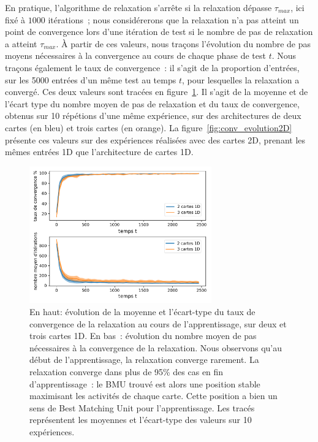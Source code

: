 \documentclass[../main]{subfiles}
\begin{document}
En pratique, l'algorithme de relaxation s'arrête si la relaxation dépasse $\tau_{max}$, ici fixé à $1000$ itérations~; nous considérerons que la relaxation n'a pas atteint un point de convergence lors d'une itération de test si le nombre de pas de relaxation a atteint $\tau_{max}$.
\`A partir de ces valeurs, nous traçons l'évolution du nombre de pas moyens nécessaires à la convergence au cours de chaque phase de test $t$.
Nous traçons également le taux de convergence~: il s'agit de la proportion d'entrées, sur les 5000 entrées d'un même test au temps $t$, pour lesquelles la relaxation a convergé.
Ces deux valeurs sont tracées en figure~\ref{fig:conv_evolution}. Il s'agit de la moyenne et de l'écart type du nombre moyen de pas de relaxation et du taux de convergence, obtenus sur 10 répétions d'une même expérience, sur des architectures de deux cartes (en bleu) et trois cartes (en orange).
La figure~\ref{fig:conv_evolution2D} présente ces valeurs sur des expériences réalisées avec des cartes 2D, prenant les mêmes entrées 1D que l'architecture de cartes 1D.

\begin{figure}
	\centering
	\includegraphics[width=0.7\textwidth]{1D_conv_evolution_total_french.pdf}
	\caption{En haut: évolution de la moyenne et l'écart-type du taux de convergence de la relaxation au cours de l'apprentissage, sur deux et trois cartes 1D. En bas~: évolution du nombre moyen de pas nécessaires à la convergence de la relaxation. Nous observons qu'au début de l'apprentissage, la relaxation converge rarement. La relaxation converge dans plus de 95\% des cas en fin d'apprentissage~: le BMU trouvé est alors une position stable maximisant les activités de chaque carte. Cette position a bien un sens de \og Best Matching Unit \fg{} pour l'apprentissage.
	Les tracés représentent les moyennes et l'écart-type des valeurs sur 10 expériences. \label{fig:conv_evolution}}
	\end{figure}
\end{document}

